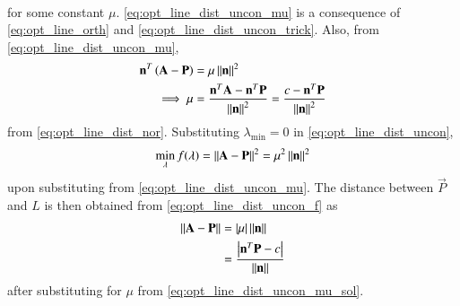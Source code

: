 \begin{enumerate}[label=\arabic*.,ref=\thesection.\theenumi]
\begin{align}
\label{eq:opt_line_dist_uncon_mu}
\end{align}
for some constant $\mu$. \eqref{eq:opt_line_dist_uncon_mu}
 is a consequence of \eqref{eq:opt_line_orth} and \eqref{eq:opt_line_dist_uncon_trick}. Also, from 
\eqref{eq:opt_line_dist_uncon_mu},
%
\begin{align}
\mathbf{n}^T\left(\mathbf{A} -\mathbf{P} \right) &= \mu \left\lVert\mathbf{n}\right\rVert^2
\\
\implies \mu & = \frac{\mathbf{n}^T\mathbf{A} -\mathbf{n}^T\mathbf{P} }{\left\lVert\mathbf{n}\right\rVert^2} = \frac{c -\mathbf{n}^T\mathbf{P} }{\left\lVert\mathbf{n}\right\rVert^2}
\label{eq:opt_line_dist_uncon_mu_sol}
\end{align}
%
from \eqref{eq:opt_line_dist_nor}.
Substituting $\lambda_{\min} = 0$ in \eqref{eq:opt_line_dist_uncon},
%
\begin{align}
\min_{\lambda}f(\lambda) =  \left\lVert\mathbf{A} -\mathbf{P}\right\rVert^2 = \mu^2\left\lVert\mathbf{n}\right\rVert^2
\label{eq:opt_line_dist_uncon_f}
\end{align}
upon substituting from \eqref{eq:opt_line_dist_uncon_mu}. The distance between $\vec{P}$ and ${L}$ is then obtained from \eqref{eq:opt_line_dist_uncon_f} as
\begin{align}
\left\lVert\mathbf{A} -\mathbf{P}\right\rVert &= \left\vert\mu\right\vert\left\lVert\mathbf{n}\right\rVert
\\
&= \frac{\left\vert\mathbf{n}^T\mathbf{P} -c \right\vert}{\left\lVert\mathbf{n}\right\rVert}
\end{align}
after substituting for $\mu$ from  \eqref{eq:opt_line_dist_uncon_mu_sol}.
%
%
\end{enumerate}
